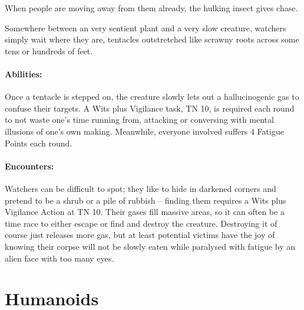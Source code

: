 \begin{multicols}{2}
When people are moving away from them already, the hulking insect gives chase.

\umberhulk

\label{watcher}

Somewhere between an very sentient plant and a very slow creature, watchers simply wait where they are, tentacles outstretched like scrawny roots across some tens or hundreds of feet.
\paragraph{Abilities:} Once a tentacle is stepped on, the creature slowly lets out a hallucinogenic gas to confuse their targets.
A Wits plus Vigilance task, TN 10, is required each round to not waste one's time running from, attacking or conversing with mental illusions of one's own making.
Meanwhile, everyone involved suffers 4 Fatigue Points each round.

\paragraph{Encounters:} Watchers can be difficult to spot; they like to hide in darkened corners and pretend to be a shrub or a pile of rubbish -- finding them requires a Wits plus Vigilance Action at TN 10.
Their gases fill massive areas, so it can often be a time race to either escape or find and destroy the creature.
Destroying it of course just releases more gas, but at least potential victims have the joy of knowing their corpse will not be slowly eaten while paralysed with fatigue by an alien face with too many eyes.

\watcher

\end{multicols}

\section{Humanoids}

